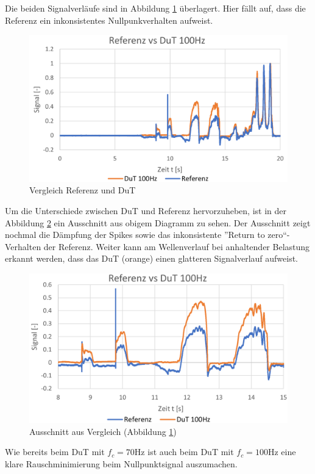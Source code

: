 \noindent Die beiden Signalverläufe sind in Abbildung \ref{fig:partcomp100hz} überlagert. Hier fällt auf, dass die Referenz ein inkonsistentes Nullpunkverhalten aufweist. 
	\begin{figure}[H]
		\centering
		\includegraphics[width=1\linewidth]{part_comp_100Hz}
		\caption{Vergleich Referenz und DuT}
		\label{fig:partcomp100hz}
	\end{figure}
\noindent Um die Unterschiede zwischen DuT und Referenz hervorzuheben, ist in der Abbildung \ref{fig:comp100hz} ein Ausschnitt aus obigem Diagramm zu sehen. Der Ausschnitt zeigt nochmal die Dämpfung der Spikes sowie das inkonsistente ''Return to zero``-Verhalten der Referenz. Weiter kann am Wellenverlauf bei anhaltender Belastung erkannt werden, dass das DuT (orange) einen glatteren Signalverlauf aufweist.
	\begin{figure}[H]
		\centering
		\includegraphics[width=1\linewidth]{comp_100Hz}
		\caption{Ausschnitt aus Vergleich (Abbildung \ref{fig:partcomp100hz})}
		\label{fig:comp100hz}
	\end{figure}
\noindent Wie bereits beim DuT mit $f_c=70$Hz ist auch beim DuT mit  $f_c=100$Hz eine klare Rauschminimierung beim Nullpunktsignal auszumachen.
